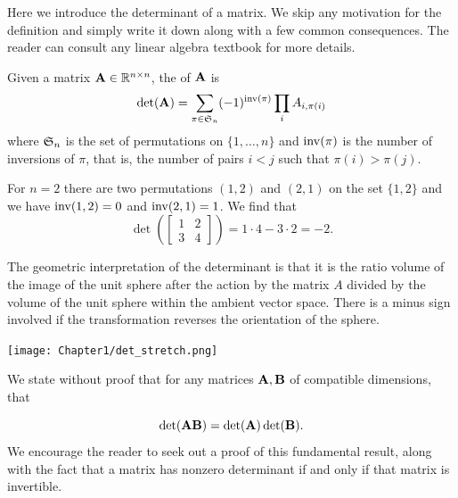 
Here we introduce the determinant of a matrix. We skip any motivation for the definition and simply write it down along with a few common consequences. The reader can consult any linear algebra textbook for more details.

\begin{definition}
Given a matrix $\MA \in \mathbb R^{n \times n}$, the  of $\MA$ is
$$\det(\MA) = \sum_{\pi \in \FS_n} (-1)^{\inv(\pi)} \prod_i A_{i, \pi(i)}$$
where $\FS_n$ is the set of permutations on $\{1,\dots,n\}$ and $\inv(\pi)$ is the number of inversions of $\pi$, that is, the number of pairs $i<j$ such that $\pi(i)>\pi(j)$.
\end{definition}

\begin{example}
For $n=2$ there are two permutations $(1,2)$ and $(2,1)$ on the set $\{1,2\}$ and we have $\inv(1,2) = 0$ and $\inv(2,1) = 1$. We find that
$$\det \left (\begin{bmatrix} 1 & 2 \\
3 & 4 \end{bmatrix} \right )  = 1\cdot4 - 3\cdot2 = -2.$$
\end{example}


\begin{note}
The geometric interpretation of the determinant is that it is the ratio volume of the image of the unit sphere after the action by the matrix $A$ divided by the volume of the unit sphere within the ambient vector space. There is a minus sign involved if the transformation reverses the orientation of the sphere.
\end{note}

 \begin{center}
  \texttt{[image: Chapter1/det\_stretch.png]}
\end{center}

We state without proof that for any matrices $\MA,\MB$ of compatible dimensions, that

\begin{equation}
    \det(\MA\MB) = \det(\MA) \det(\MB).
\end{equation} 
We encourage the reader to seek out a proof of this fundamental result, along with the fact that a matrix has nonzero determinant if and only if that matrix is invertible.

